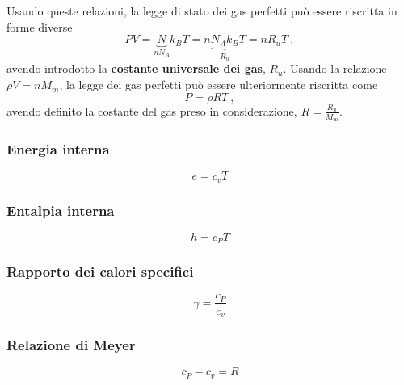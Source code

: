 \noindent
Usando queste relazioni, la legge di stato dei gas perfetti può essere riscritta in forme diverse
\begin{equation}
    P V = \underbrace{N}_{n N_A} k_B T = n \underbrace{N_A k_B}_{R_u} T = n R_u T \ ,
\end{equation}
avendo introdotto la \textbf{costante universale dei gas}, $R_u$.
Usando la relazione $\rho V = n M_m$, la legge dei gas perfetti può essere ulteriormente riscritta come
\begin{equation}
   P = \rho R T \ ,
\end{equation}
avendo definito la costante del gas preso in considerazione, $R = \frac{R_u}{M_m}$.



\subsubsection{Energia interna}
\begin{equation}
  e = c_v T
\end{equation}
\subsubsection{Entalpia interna}
\begin{equation}
  h = c_P T
\end{equation}
\subsubsection{Rapporto dei calori specifici}
\begin{equation}
    \gamma = \frac{c_P}{c_v}
\end{equation}
\subsubsection{Relazione di Meyer}
\begin{equation}
  c_P - c_v = R
\end{equation}
